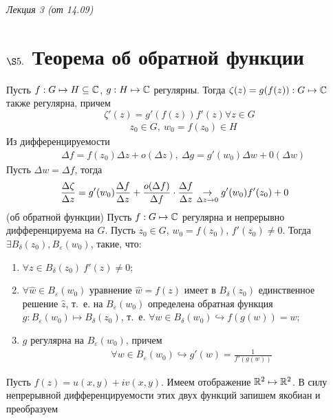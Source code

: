 \begin{flushright}
    \textit{Лекция 3 (от 14.09)}
\end{flushright}
\section{$\S 5.$ Теорема об обратной функции}
\theorem
Пусть $f: G \mapsto H \subseteq \mathbb{C}$, $g: H \mapsto \mathbb{C}$ регулярны.
Тогда $\zeta(z) = g(f(z)): G \mapsto \mathbb{C}$ также регулярна, причем
\begin{equation}\label{(5.1)}
    \zeta'(z) = g'(f(z))f'(z) \forall z \in G
\end{equation}
\pr
\begin{align*}
  & z_0 \in G, \ w_0 = f(z_0) \in H
\end{align*}
Из дифференцируемости
\begin{align*}
  & \Delta f = f(z_0)\Delta z + o(\Delta z), \ \Delta g = g'(w_0) \Delta w + 0(\Delta w)
\end{align*}
Пусть $\Delta w = \Delta f$, тогда
\begin{align*}
  & \frac{\Delta \zeta}{\Delta z} = g'(w_0) \frac{\Delta f}{\Delta z} + \frac{o(\Delta f)}{\Delta f} \cdot \frac{\Delta f}{\Delta z} \underset{\Delta z \to 0}{\to} g'(w_0)f'(z_0) + 0
\end{align*}
\theorem (об обратной функции)
Пусть $f: G \mapsto \mathbb{C}$ регулярна и непрерывно дифференцируема на $G$. Пусть
$z_0 \in G$, $w_0 = f(z_0)$, $f'(z_0) \neq 0$. Тогда $\exists B_\delta(z_0),
B_\varepsilon(w_0)$, такие, что:
\begin{enumerate}
    \item $\forall z \in B_\delta(z_0) \ f'(z) \neq 0$;
    \item $\forall \hat{w} \in B_\varepsilon(w_0)$ уравнение $\hat{w} = f(z)$
    имеет в $B_\delta(z_0)$ единственное решение $\hat{z}$, т.~е. на
    $B_\varepsilon(w_0)$ определена обратная функция $g: B_\varepsilon(w_0)
    \mapsto B_\delta(z_0)$, т.~е. $\forall w \in B_\delta(w_0) \hookrightarrow
    f(g(w)) = w$;
    \item $g$ регулярна на $B_\varepsilon(w_0)$, причем
    \begin{align*}
      & \forall w \in B_\varepsilon(w_0) \hookrightarrow g'(w) = \frac{1}{f'(g(w))}
    \end{align*}
\end{enumerate}
\pr
Пусть $f(z) = u(x,y) +iv(x,y)$. Имеем отображение $\mathbb{R}^2 \mapsto \mathbb{R}^2$. В силу
непрерывной дифференцируемости этих двух функций запишем якобиан и преобразуем

